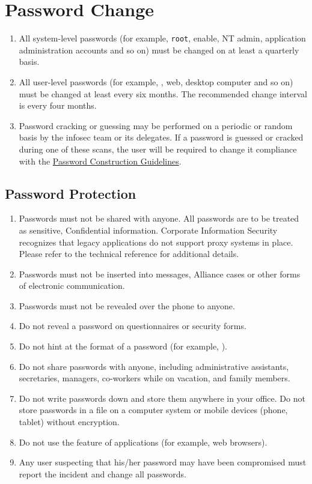 \section{Password Change}
\begin{enumerate}
\item
All system-level passwords (for example, \texttt{root}, enable, NT admin, application administration accounts\oxford{} and so on) must be changed on at least a quarterly basis.
\item
All user-level passwords (for example, \email{}, web, desktop computer\oxford{} and so on) must be changed at least every six months.  
The recommended change interval is every four months.
\item
Password cracking or guessing may be performed on a periodic or random basis by the \gls{infosec} team or its delegates.  
If a password is guessed or cracked during one of these scans, the user will be required to change it  compliance with the \hyperref[G:PCG]{Password Construction Guidelines}.
\end{enumerate}
\subsection*{Password Protection}
\begin{enumerate}
\item
Passwords must not be shared with anyone.  
All passwords are to be treated as sensitive, Confidential \CompanyName{} information.  
Corporate Information Security recognizes that legacy applications do not support proxy systems in place.  
Please refer to the technical reference for additional details.
\item
Passwords must not be inserted into \email{} messages, Alliance cases\oxford{} or other forms of electronic communication.
\item
Passwords must not be revealed over the phone to anyone.
\item
Do not reveal a password on questionnaires or security forms.
\item
Do not hint at the format of a password (for example, ).
\item
Do not share \CompanyName{} passwords with anyone, including administrative assistants, secretaries, managers, co-workers while on vacation, and family members.
\item
Do not write passwords down and store them anywhere in your office.  
Do not store passwords in a file on a computer system or mobile devices (phone, tablet) without encryption.
\item
Do not use the  feature of applications (for example, web browsers).
\item
Any user suspecting that his/her password may have been compromised must report the incident and change all passwords.
\end{enumerate}
